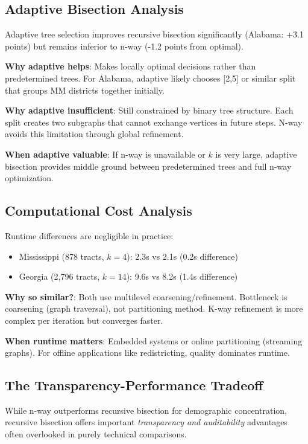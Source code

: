 \subsection{Adaptive Bisection Analysis}

Adaptive tree selection improves recursive bisection significantly (Alabama: +3.1 points) but remains inferior to n-way (-1.2 points from optimal).

\textbf{Why adaptive helps}: Makes locally optimal decisions rather than predetermined trees. For Alabama, adaptive likely chooses [2,5] or similar split that groups MM districts together initially.

\textbf{Why adaptive insufficient}: Still constrained by binary tree structure. Each split creates two subgraphs that cannot exchange vertices in future steps. N-way avoids this limitation through global refinement.

\textbf{When adaptive valuable}: If n-way is unavailable or $k$ is very large, adaptive bisection provides middle ground between predetermined trees and full n-way optimization.

\subsection{Computational Cost Analysis}

Runtime differences are negligible in practice:
\begin{itemize}
\item Mississippi (878 tracts, $k=4$): 2.3s vs 2.1s (0.2s difference)
\item Georgia (2,796 tracts, $k=14$): 9.6s vs 8.2s (1.4s difference)
\end{itemize}

\textbf{Why so similar?}: Both use multilevel coarsening/refinement. Bottleneck is coarsening (graph traversal), not partitioning method. K-way refinement is more complex per iteration but converges faster.

\textbf{When runtime matters}: Embedded systems or online partitioning (streaming graphs). For offline applications like redistricting, quality dominates runtime.

\subsection{The Transparency-Performance Tradeoff}

While n-way outperforms recursive bisection for demographic concentration, recursive bisection offers important \textit{transparency and auditability} advantages often overlooked in purely technical comparisons.

